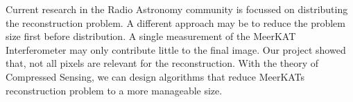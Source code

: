 Current research in the Radio Astronomy community is focussed on distributing the reconstruction problem. A different approach may be to reduce the problem size first before distribution. A single measurement of the MeerKAT Interferometer may only contribute little to the final image. Our project showed that, not all pixels are relevant for the reconstruction. With the theory of Compressed Sensing, we can design algorithms that reduce MeerKATs reconstruction problem to a more manageable size.















